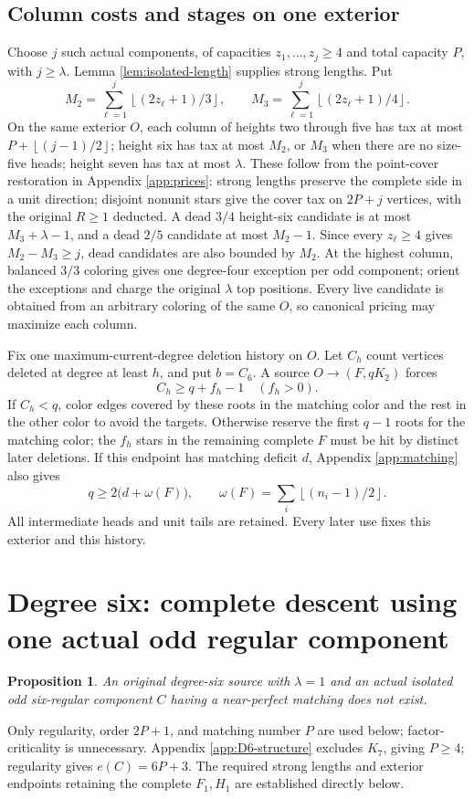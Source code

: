 \documentclass[11pt,a4paper]{article}
\newcommand{\floor}[1]{\left\lfloor#1\right\rfloor}
\newtheorem{proposition}[theorem]{Proposition}
\theoremstyle{definition}
\begin{document}
\subsection{Column costs and stages on one exterior}
Choose $j$ such actual components, of capacities $z_1,\ldots,z_j\ge4$ and total capacity $P$, with $j\ge\lambda$. Lemma \ref{lem:isolated-length} supplies strong lengths. Put
\[
 M_2=\sum_{\ell=1}^j\floor{(2z_\ell+1)/3},\qquad
 M_3=\sum_{\ell=1}^j\floor{(2z_\ell+1)/4}.
\]
On the same exterior $O$, each column of heights two through five has tax at most $P+\floor{(j-1)/2}$; height six has tax at most $M_2$, or $M_3$ when there are no size-five heads; height seven has tax at most $\lambda$. These follow from the point-cover restoration in Appendix \ref{app:prices}: strong lengths preserve the complete side in a unit direction; disjoint nonunit stars give the cover tax on $2P+j$ vertices, with the original $R\ge1$ deducted. A dead $3/4$ height-six candidate is at most $M_3+\lambda-1$, and a dead $2/5$ candidate at most $M_2-1$. Since every $z_\ell\ge4$ gives $M_2-M_3\ge j$, dead candidates are also bounded by $M_2$. At the highest column, balanced $3/3$ coloring gives one degree-four exception per odd component; orient the exceptions and charge the original $\lambda$ top positions. Every live candidate is obtained from an arbitrary coloring of the same $O$, so canonical pricing may maximize each column.

Fix one maximum-current-degree deletion history on $O$. Let $C_h$ count vertices deleted at degree at least $h$, and put $b=C_6$. A source $O\to(F,qK_2)$ forces
\[
 C_h\ge q+f_h-1\quad(f_h>0).
\]
If $C_h<q$, color edges covered by these roots in the matching color and the rest in the other color to avoid the targets. Otherwise reserve the first $q-1$ roots for the matching color; the $f_h$ stars in the remaining complete $F$ must be hit by distinct later deletions. If this endpoint has matching deficit $d$, Appendix \ref{app:matching} also gives
\[
 q\ge2\bigl(d+\omega(F)\bigr),\qquad
 \omega(F)=\sum_i\floor{(n_i-1)/2}.
\]
All intermediate heads and unit tails are retained. Every later use fixes this exterior and this history.

\section{Degree six: complete descent using one actual odd regular component}\label{app:D6-one}
\begin{proposition}\label{prop:D6-one}
An original degree-six source with $\lambda=1$ and an actual isolated odd six-regular component $C$ having a near-perfect matching does not exist.
\end{proposition}
Only regularity, order $2P+1$, and matching number $P$ are used below; factor-criticality is unnecessary.
Appendix \ref{app:D6-structure} excludes $K_7$, giving $P\ge4$; regularity gives $e(C)=6P+3$.
The required strong lengths and exterior endpoints retaining the complete $F_1,H_1$ are established directly below.
\end{document}
